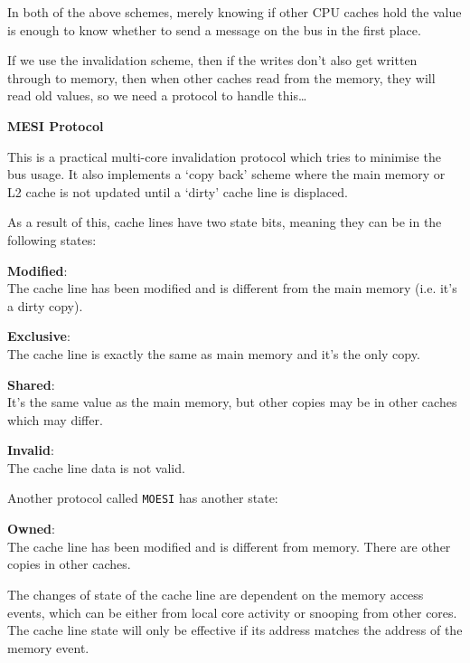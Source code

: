 In both of the above schemes, merely knowing if other CPU caches hold the value
is enough to know whether to send a message on the bus in the first place.

If we use the invalidation scheme, then if the writes don't also get written
through to memory, then when other caches read from the memory, they will read
old values, so we need a protocol to handle this\dots

\textbf{MESI Protocol}

This is a practical multi-core invalidation protocol which tries to minimise the
bus usage. It also implements a `copy back' scheme where the main memory or L2
cache is not updated until a `dirty' cache line is displaced. 

As a result of this, cache lines have two state bits, meaning they can be in the
following states:

\begin{description}
  \item \textbf{Modified}:\\
    The cache line has been modified and is different from the main memory (i.e.
    it's a dirty copy).
  \item \textbf{Exclusive}:\\
    The cache line is exactly the same as main memory and it's the only copy.
  \item \textbf{Shared}:\\
    It's the same value as the main memory, but other copies may be in other
    caches which may differ.
  \item \textbf{Invalid}:\\
    The cache line data is not valid.
\end{description} 

Another protocol called \texttt{MOESI} has another state:

\begin{description}
  \item \textbf{Owned}:\\
    The cache line has been modified and is different from memory. There are
    other copies in other caches.
\end{description}


The changes of state of the cache line are dependent on the memory access
events, which can be either from local core activity or snooping from other
cores. The cache line state will only be effective if its address matches the
address of the memory event.

